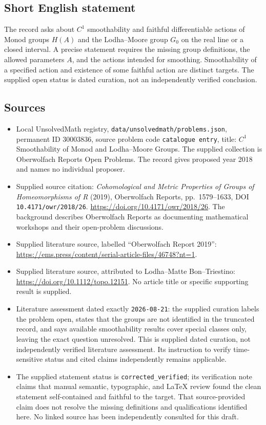 \documentclass[11pt]{article}
\begin{document}
\subsection{Short English statement}
The record asks about \(C^1\) smoothability and faithful differentiable actions of Monod groups \(H(A)\) and the Lodha--Moore group \(G_0\) on the real line or a closed interval. A precise statement requires the missing group definitions, the allowed parameters \(A\), and the actions intended for smoothing. Smoothability of a specified action and existence of some faithful action are distinct targets. The supplied open status is dated curation, not an independently verified conclusion.
\subsection{Sources}
\begin{itemize}
\item Local UnsolvedMath registry, \texttt{data/unsolvedmath/problems.json}, permanent ID \(30003836\), source problem code \texttt{catalogue entry}, title: \(C^1\) Smoothability of Monod and Lodha--Moore Groups. The supplied collection is Oberwolfach Reports Open Problems. The record gives proposed year 2018 and names no individual proposer.
\item Supplied source citation: \emph{Cohomological and Metric Properties of Groups of Homeomorphisms of R} (2019), Oberwolfach Reports, pp.\ 1579--1633, DOI \texttt{10.4171/owr/2018/26}. \url{https://doi.org/10.4171/owr/2018/26}. The background describes Oberwolfach Reports as documenting mathematical workshops and their open-problem discussions.
\item Supplied literature source, labelled ``Oberwolfach Report 2019'': \url{https://ems.press/content/serial-article-files/46748?nt=1}.
\item Supplied literature source, attributed to Lodha--Matte Bon--Triestino: \url{https://doi.org/10.1112/topo.12151}. No article title or specific supporting result is supplied.
\item Literature assessment dated exactly \texttt{2026-08-21}: the supplied curation labels the problem open, states that the groups are not identified in the truncated record, and says available smoothability results cover special classes only, leaving the exact question unresolved. This is supplied dated curation, not independently verified literature assessment. Its instruction to verify time-sensitive status and cited claims independently remains applicable.
\item The supplied statement status is \texttt{corrected\_verified}; its verification note claims that manual semantic, typographic, and LaTeX review found the clean statement self-contained and faithful to the target. That source-provided claim does not resolve the missing definitions and qualifications identified here. No linked source has been independently consulted for this draft.
\end{itemize}
\end{document}
